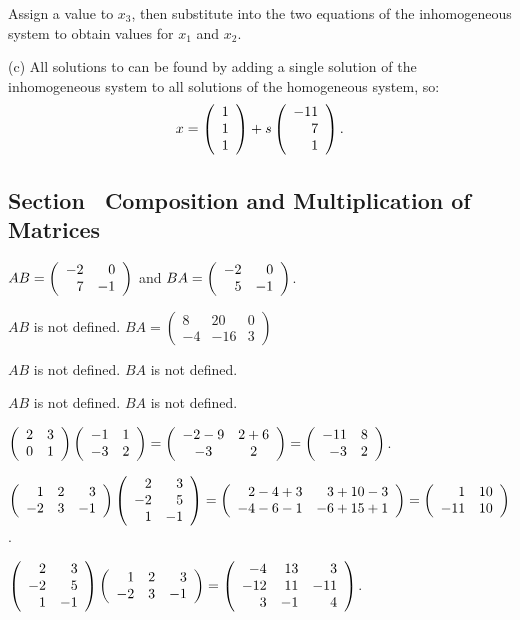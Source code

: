 \soln Assign a value to $x_3$, then substitute into the two equations
of the inhomogeneous system to obtain values for $x_1$ and $x_2$.

(c) All solutions to  can be found by adding a
single solution of the inhomogeneous system to all solutions
of the homogeneous system, so:
\[
x = \left(\begin{array}{r} 1 \\ 1 \\ 1\end{array}\right) + s\left(\begin{array}{r} -11 \\ 7 \\ 1\end{array}\right).
\]



\newpage
\subsection*{Section~\protect{\ref{S:4.6}} Composition and Multiplication
of Matrices}

 $AB=\left(\begin{array}{rr} -2 & 0\\ 7 &-1\end{array}\right)$ and $BA= \left(\begin{array}{rr} -2 & 0\\ 5 &-1\end{array}\right)$.

 $AB$ is not defined. $BA=\left(\begin{array}{rrr} 8 &  20 &  0\\
 -4 & -16  &  3\end{array}\right)$


 $AB$ is not defined. $BA$  is not defined.  

 $AB$ is not defined. $BA$  is not defined.


$\left(\begin{array}{rr} 2 & 3\\ 0 &1\end{array}\right)\left(\begin{array}{rr} -1 & 1\\ -3 &2\end{array}\right) =
\left(\begin{array}{cc} -2 - 9 & 2+6\\ -3 &2\end{array}\right) = \left(\begin{array}{rr} -11 & 8\\ -3 &2\end{array}\right)$.

$\left(\begin{array}{rrr} 1 & 2 & 3\\ -2 & 3 & -1 \end{array}\right)
\left(\begin{array}{rr} 2 & 3\\ -2 & 5 \\1 & -1 \end{array}\right)
= \left(\begin{array}{rr} 2 - 4 + 3 & 3 + 10 - 3\\ -4 - 6 - 1 &-6 + 15 + 1\end{array}\right)
= \left(\begin{array}{rr} 1 & 10\\ -11 &10\end{array}\right)$.

 $\left(\begin{array}{rr} 2 & 3\\ -2 & 5 \\1 & -1 \end{array}
\right) \left(\begin{array}{rrr} 1 & 2 & 3\\ -2 & 3 & -1 \end{array}\right)
= \left(\begin{array}{rrr} -4 & 13 & 3 \\ -12 & 11 & -11 \\ 3 & -1 & 4\end{array}\right)$.

